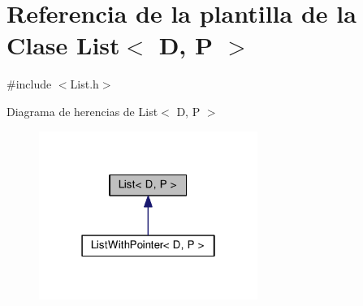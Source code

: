 \hypertarget{class_list}{\section{Referencia de la plantilla de la Clase List$<$ D, P $>$}
\label{class_list}
}


{\ttfamily \#include $<$List.\-h$>$}



Diagrama de herencias de List$<$ D, P $>$\nopagebreak
\begin{figure}[H]
\begin{center}
\leavevmode
\includegraphics[width=202pt]{class_list__inherit__graph}
\end{center}
\end{figure}
